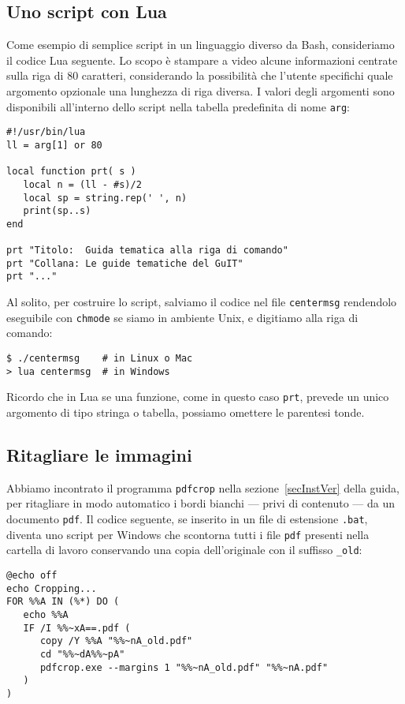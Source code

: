 \subsection{Uno script con Lua}

Come esempio di semplice script in un linguaggio diverso da Bash, consideriamo
il codice Lua seguente. Lo scopo è stampare a video alcune informazioni centrate
sulla riga di 80 caratteri, considerando la possibilità che l'utente specifichi
quale argomento opzionale una lunghezza di riga diversa. I valori degli
argomenti sono disponibili all'interno dello script nella tabella predefinita di
nome \texttt{arg}:
\begin{Verbatim}
#!/usr/bin/lua
ll = arg[1] or 80

local function prt( s )
   local n = (ll - #s)/2
   local sp = string.rep(' ', n)
   print(sp..s)
end

prt "Titolo:  Guida tematica alla riga di comando"
prt "Collana: Le guide tematiche del GuIT"
prt "..."
\end{Verbatim}
Al solito, per costruire lo script, salviamo il codice nel file
\texttt{centermsg} rendendolo eseguibile con \texttt{chmode} se siamo in
ambiente Unix, e digitiamo alla riga di comando:
\begin{Verbatim}
$ ./centermsg    # in Linux o Mac
> lua centermsg  # in Windows
\end{Verbatim}
Ricordo che in Lua se una funzione, come in questo caso \texttt{prt}, prevede
un unico argomento di tipo stringa o tabella, possiamo omettere le parentesi
tonde.

\subsection{Ritagliare le immagini}
\label{subsec}

Abbiamo incontrato il programma \texttt{pdfcrop} nella
sezione~\ref{secInstVer} della guida, per ritagliare in modo automatico i bordi
bianchi --- privi di contenuto --- da un documento \texttt{pdf}. Il codice
seguente, se inserito in un file di estensione \texttt{.bat}, diventa uno
script per Windows che scontorna tutti i file \texttt{pdf} presenti nella
cartella di lavoro conservando una copia dell'originale con il suffisso
\texttt{\_old}:
\begin{Verbatim}
@echo off
echo Cropping...
FOR %%A IN (%*) DO (
   echo %%A
   IF /I %%~xA==.pdf (
      copy /Y %%A "%%~nA_old.pdf"
      cd "%%~dA%%~pA"
      pdfcrop.exe --margins 1 "%%~nA_old.pdf" "%%~nA.pdf"
   )
)
\end{Verbatim}

